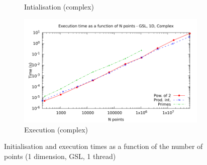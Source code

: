 \documentclass[12pt, a4paper]{article}
\begin{document}
\begin{figure}[H]
\begin{subfigure}{.5\textwidth}
\caption{Intialisation (complex)}
\label{1DGSLCI}
\end{subfigure}%
\begin{subfigure}{.5\textwidth}
\centering
\includegraphics[width=.9\linewidth]{graphs/1d-gsl-exec-c.pdf}
\caption{Execution (complex)}
\label{1DGSLC}
\end{subfigure}
\caption{Initialisation and execution times as a function of the number of points (1 dimension, GSL, 1 thread)}
\label{1DGSL}
\end{figure}
\end{document}
